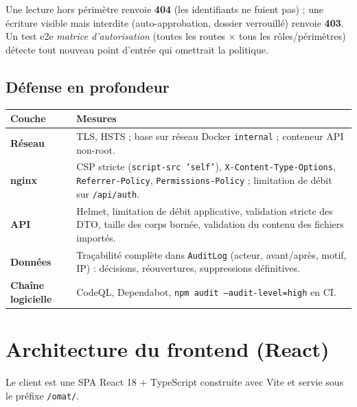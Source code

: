 \documentclass[10.5pt,a4paper]{article}
\newcommand{\code}[1]{\texttt{\small #1}}
\begin{document}
Une lecture hors périmètre renvoie \textbf{404} (les identifiants ne fuient pas) ; une écriture visible
mais interdite (auto-approbation, dossier verrouillé) renvoie \textbf{403}. Un test e2e \emph{matrice
d'autorisation} (toutes les routes × tous les rôles/périmètres) détecte tout nouveau point d'entrée qui
omettrait la politique.

\subsection{Défense en profondeur}
\begin{tabularx}{\textwidth}{@{}>{\bfseries}l X@{}}
\toprule
Couche & Mesures \\
\midrule
Réseau & TLS, HSTS ; base sur réseau Docker \code{internal} ; conteneur API non-root. \\
nginx & CSP stricte (\code{script-src 'self'}), \code{X-Content-Type-Options}, \code{Referrer-Policy}, \code{Permissions-Policy} ; limitation de débit sur \code{/api/auth}. \\
API & Helmet, limitation de débit applicative, validation stricte des DTO, taille des corps bornée, validation du contenu des fichiers importés. \\
Données & Traçabilité complète dans \code{AuditLog} (acteur, avant/après, motif, IP) : décisions, réouvertures, suppressions définitives. \\
Chaîne logicielle & CodeQL, Dependabot, \code{npm audit --audit-level=high} en CI. \\
\bottomrule
\end{tabularx}

\section{Architecture du frontend (React)}

Le client est une SPA React 18 + TypeScript construite avec Vite et servie sous le préfixe \code{/omat/}.
\end{document}
